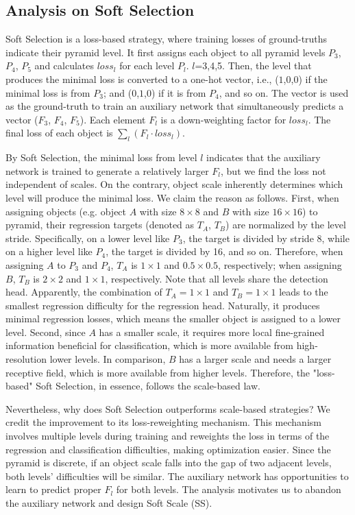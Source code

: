 \documentclass[runningheads]{llncs}
\begin{document}
\subsection{Analysis on Soft Selection}
Soft Selection is a loss-based strategy, where training losses of ground-truths indicate their pyramid level. It first assigns each object to all pyramid levels $P_3$, $P_4$, $P_5$ and calculates $loss_l$ for each level $P_l$. $l$=3,4,5. Then, the level that produces the minimal loss is converted to a one-hot vector, i.e., ($1$,$0$,$0$) if the minimal loss is from $P_3$; and ($0$,$1$,$0$) if it is from $P_4$, and so on. The vector is used as the ground-truth to train an auxiliary network that simultaneously predicts a vector ($F_3$, $F_4$, $F_5$). Each element $F_l$ is a down-weighting factor for $loss_l$. The final loss of each object is $\sum_l (F_l \cdot loss_l)$. 

By Soft Selection, the minimal loss from level $l$ indicates that the auxiliary network is trained to generate a relatively larger $F_l$, but we find the loss not independent of scales. On the contrary, object scale inherently determines which level will produce the minimal loss. We claim the reason as follows. First, when assigning objects (e.g. object $A$ with size $8\times8$ and $B$ with size $16\times16$) to pyramid, their regression targets (denoted as $T_A$, $T_B$) are normalized by the level stride. Specifically, on a lower level like $P_3$, the target is divided by stride 8, while on a higher level like $P_4$, the target is divided by 16, and so on. Therefore, when assigning $A$ to $P_3$ and $P_4$, $T_A$ is $1\times1$ and $0.5\times0.5$, respectively; when assigning $B$, $T_B$ is $2\times2$ and $1\times1$, respectively. Note that all levels share the detection head. Apparently, the combination of $T_A=1\times1$ and $T_B = 1\times1$ leads to the smallest regression difficulty for the regression head. Naturally, it produces minimal regression losses, which means the smaller object is assigned to a lower level. Second, since $A$ has a smaller scale, it requires more local fine-grained information beneficial for classification, which is more available from high-resolution lower levels. In comparison, $B$ has a larger scale and needs a larger receptive field, which is more available from higher levels. Therefore, the "loss-based" Soft Selection, in essence, follows the scale-based law. 

Nevertheless, why does Soft Selection outperforms scale-based strategies? We credit the improvement to its loss-reweighting mechanism. This mechanism involves multiple levels during training and reweights the loss in terms of the regression and classification difficulties, making optimization easier. Since the pyramid is discrete, if an object scale falls into the gap of two adjacent levels, both levels' difficulties will be similar. The auxiliary network has opportunities to learn to predict proper $F_l$ for both levels. The analysis motivates us to abandon the auxiliary network and design Soft Scale (SS). 
\end{document}
